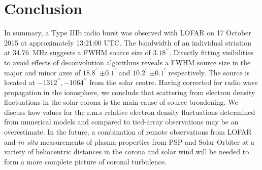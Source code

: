 \section{Conclusion}
In summary, a Type IIIb radio burst was observed with LOFAR on 17 October 2015 at approximately 13:21:00 UTC. The bandwidth of an individual striation at 34.76~MHz suggests a FWHM source size of $3.18^{\prime\prime}$. Directly fitting visibilities to avoid effects of deconvolution algorithms reveals a FWHM source size in the major and minor axes of $18.8^\prime$ $\pm 0.1^\prime$ and $10.2^\prime$ $\pm 0.1^\prime$ respectively. The source is located at $-1312^{\prime\prime}, -1064^{\prime\prime}$ from the solar centre. 
Having corrected for radio wave propagation in the ionosphere, we conclude that scattering from electron density fluctuations in the solar corona is the main cause of source broadening. We discuss how values for the r.m.s relative electron density fluctuations determined from numerical models and compared to tied-array observations may be an overestimate. 
In the future, a combination of remote observations from LOFAR and \textit{in situ} measurements of plasma properties from PSP and Solar Orbiter \citep{Muller2013,Muller2020} at a variety of heliocentric distances in the corona and solar wind will be needed to form a more complete picture of coronal turbulence.
